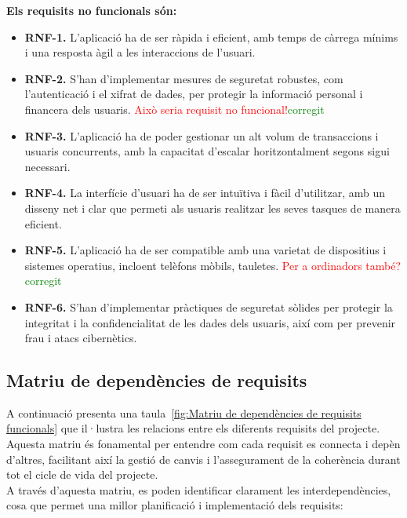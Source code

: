 \documentclass[a4paper,12pt,twoside]{ThesisStyle}
\newcommand{\pau}[1]{\textcolor{red}{#1}}
\newcommand{\sudan}[1]{\textcolor{green}{#1}}
\begin{document}
\textbf{Els requisits no funcionals són:}
\begin{itemize}
    \item \textbf{RNF-1.} L'aplicació ha de ser ràpida i eficient, amb temps de càrrega mínims i una resposta àgil a les interaccions de l'usuari.
    \item \textbf{RNF-2.} S'han d'implementar mesures de seguretat robustes, com l'autenticació i el xifrat de dades, per protegir la informació personal i financera dels usuaris. \pau{Això seria requisit no funcional!}\sudan{corregit}
    \item \textbf{RNF-3.} L'aplicació ha de poder gestionar un alt volum de transaccions i usuaris concurrents, amb la capacitat d'escalar horitzontalment segons sigui necessari.
    \item \textbf{RNF-4.} La interfície d'usuari ha de ser intuïtiva i fàcil d'utilitzar, amb un disseny net i clar que permeti als usuaris realitzar les seves tasques de manera eficient.
    \item \textbf{RNF-5.} L'aplicació ha de ser compatible amb una varietat de dispositius i sistemes operatius, incloent telèfons mòbils, tauletes. \pau{Per a ordinadors també?}\sudan{corregit}
    \item \textbf{RNF-6.} S'han d'implementar pràctiques de seguretat sòlides per protegir la integritat i la confidencialitat de les dades dels usuaris, així com per prevenir frau i atacs cibernètics.

\end{itemize}


\subsection{Matriu de dependències de requisits}
\label{Matriu de dependències de requisits}

A continuació presenta una taula~\ref{fig:Matriu de dependències de requisits funcionals} que il·lustra les relacions entre els diferents requisits del projecte. Aquesta matriu és fonamental per entendre com cada requisit es connecta i depèn d'altres, facilitant així la gestió de canvis i l'assegurament de la coherència durant tot el cicle de vida del projecte.\\

A través d'aquesta matriu, es poden identificar clarament les interdependències, cosa que permet una millor planificació i implementació dels requisits:
\end{document}

